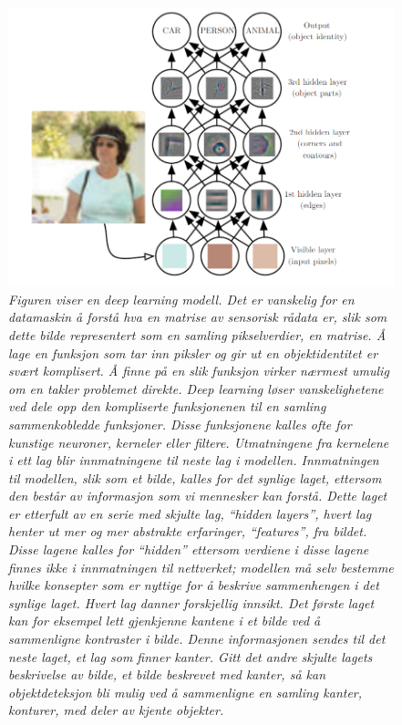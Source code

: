 \begin{figure} 
\begin{center} 
\includegraphics[scale=0.7]{figures/deep}
\caption{\small \sl Figuren viser en deep learning modell. Det er vanskelig for en datamaskin å forstå hva en matrise av sensorisk rådata er, slik som dette bilde representert som en samling pikselverdier, en matrise. Å lage en funksjon som tar inn piksler og gir ut en objektidentitet er svært komplisert. Å finne på en slik funksjon virker nærmest umulig om en takler problemet direkte. Deep learning løser vanskelighetene ved dele opp den kompliserte funksjonenen til en samling sammenkobledde funksjoner. Disse funksjonene kalles ofte for kunstige neuroner, kerneler eller filtere. Utmatningene fra kernelene i ett lag blir innmatningene til neste lag i modellen. Innmatningen til modellen, slik som et bilde, kalles for det synlige laget, ettersom den består av informasjon som vi mennesker kan forstå. Dette laget er etterfult av en serie med skjulte lag, ``hidden layers'', hvert lag henter ut mer og mer abstrakte erfaringer, ``features'', fra bildet. Disse lagene kalles for ``hidden'' ettersom verdiene i disse lagene finnes ikke i innmatningen til nettverket; modellen må selv bestemme hvilke konsepter som er nyttige for å beskrive sammenhengen i det synlige laget. Hvert lag danner forskjellig innsikt. Det første laget kan for eksempel lett gjenkjenne kantene i et bilde ved å sammenligne kontraster i bilde. Denne informasjonen sendes til det neste laget, et lag som finner kanter. Gitt det andre skjulte lagets beskrivelse av bilde, et bilde beskrevet med kanter, så kan objektdeteksjon bli mulig ved å sammenligne en samling kanter, konturer, med deler av kjente objekter. \cite{Goodfellow m.fl. 2016 s. 6} \label{fig:deep}} 
\end{center} 
\end{figure} 

